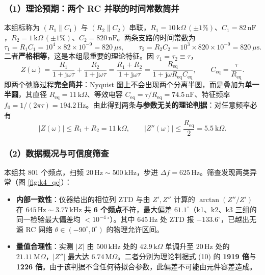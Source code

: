 \documentclass[12pt,a4paper]{ctexart}
\begin{document}
\subsubsection*{（1）理论预期：两个 RC 并联的时间常数简并}
本组标称为 $(R_1\parallel C_1)$ 与 $(R_2\parallel C_2)$ 串联，$R_1=10\,\mathrm{k}\Omega\,(\pm1\%)$、$C_1=82\,\mathrm{nF}$，$R_2=1\,\mathrm{k}\Omega\,(\pm1\%)$、$C_2=820\,\mathrm{nF}$。两条支路的时间常数为
\begin{equation}
    \tau_1=R_1C_1=10^4\times82\times10^{-9}=820\ \mu\mathrm{s},\qquad
    \tau_2=R_2C_2=10^3\times820\times10^{-9}=820\ \mu\mathrm{s}.
\end{equation}
二者\textbf{严格相等}，这是本组最重要的理论特征。因 $\tau_1=\tau_2\equiv\tau$，
\begin{equation}
    Z(\omega)=\frac{R_1}{1+\mathrm{j}\omega\tau}+\frac{R_2}{1+\mathrm{j}\omega\tau}
    =\frac{R_1+R_2}{1+\mathrm{j}\omega\tau}
    =\frac{R_{\mathrm{eq}}}{1+\mathrm{j}\omega R_{\mathrm{eq}}C_{\mathrm{eq}}},
    \qquad C_{\mathrm{eq}}=\frac{\tau}{R_{\mathrm{eq}}}.
\end{equation}
即两个弛豫过程\textbf{完全简并}：Nyquist 图上不会出现两个分离半圆，而是叠加为\textbf{单一半圆}，其直径 $R_{\mathrm{eq}}=11\,\mathrm{k}\Omega$、等效电容 $C_{\mathrm{eq}}=\tau/R_{\mathrm{eq}}=74.5\,\mathrm{nF}$、特征频率 $f_0=1/(2\pi\tau)=194.2\,\mathrm{Hz}$。由此得到两条\textbf{与参数无关的理论判据}：对任意频率必有
\begin{equation}
    |Z(\omega)|\le R_1+R_2=11\ \mathrm{k}\Omega,\qquad |Z''(\omega)|\le \frac{R_{\mathrm{eq}}}{2}=5.5\ \mathrm{k}\Omega .
\end{equation}

\subsubsection*{（2）数据概况与可信度筛查}
本组共 801 个频点，扫频 $20\,\mathrm{Hz}\sim500\,\mathrm{kHz}$，步进 $\Delta f=625\,\mathrm{Hz}$。筛查发现两类异常（图 \ref{fig:k4_qc}）：

\begin{itemize}
    \item \textbf{内部一致性}：仪器给出的相位列 ZTD 与由 $Z',Z''$ 计算的 $\arctan(Z''/Z')$ 在 $645\,\mathrm{Hz}\sim3.77\,\mathrm{kHz}$ 共 \textbf{6 个频点}不符，最大偏差 $61.1^\circ$（k1、k2、k3 三组的同一检验最大偏差均 $<10^{-4}\,^\circ$）。其中 $645\,\mathrm{Hz}$ 处 ZTD 报 $-133.6^\circ$，已越出无源 RC 网络 $\theta\in(-90^\circ,0^\circ)$ 的物理允许区间。
    \item \textbf{量值合理性}：实测 $|Z|$ 由 $500\,\mathrm{kHz}$ 处的 $42.9\,\mathrm{k}\Omega$ 单调升至 $20\,\mathrm{Hz}$ 处的 $21.11\,\mathrm{M}\Omega$，$|Z''|$ 最大达 $6.74\,\mathrm{M}\Omega$。二者分别为理论判据式 (10) 的 \textbf{1919 倍}与 \textbf{1226 倍}。由于该判据不含任何待拟合参数，此偏差不可能由元件容差造成。
\end{itemize}
\end{document}

